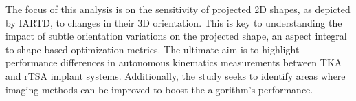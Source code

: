 The focus of this analysis is on the sensitivity of projected 2D shapes, as depicted by IARTD, to changes in their 3D orientation.
This is key to understanding the impact of subtle orientation variations on the projected shape, an aspect integral to shape-based optimization metrics.
The ultimate aim is to highlight performance differences in autonomous kinematics measurements between TKA and rTSA implant systems.
Additionally, the study seeks to identify areas where imaging methods can be improved to boost the algorithm's performance.

